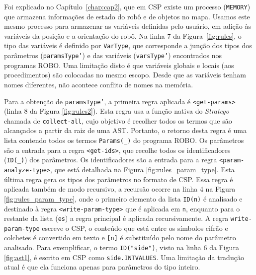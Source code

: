 Foi explicado no Capítulo~\ref{chap:cap2}, que em CSP existe um processo (\texttt{MEMORY}) que armazena informações de estado do robô e de objetos no mapa. Usamos este mesmo processo para armazenar as variáveis definidas pelo usuário, em adição às variáveis da posição e a orientação do robô. Na linha 7 da Figura~\ref{fig:rules}, o tipo das variáveis é definido por \texttt{VarType}, que corresponde a junção dos tipos dos parâmetros (\texttt{paramsType'}) e das variáveis (\texttt{varsType'}) encontrados nos programas ROBO. Uma limitação disto é que variáveis globais e locais (aos procedimentos) são colocadas no mesmo escopo. Desde que as variáveis tenham nomes diferentes, não acontece conflito de nomes na memória.   

Para a obtenção de \texttt{paramsType'}, a primeira regra aplicada é \texttt{<get-params>} (linha 8 da Figura \ref{fig:rules2}). Esta regra usa a função nativa do \textit{Stratego} chamada de \texttt{collect-all}, cujo objetivo é recolher todos os termos que são alcançados a partir da raiz de uma AST. Portanto, o retorno desta regra é uma lista contendo todos os termos \texttt{Params(\_)} do programa ROBO. Os parâmetros são a entrada para a regra \texttt{<get-ids>}, que recolhe todos os identificadores (\texttt{ID(\_)}) dos parâmetros. Os identificadores são a entrada para a regra \texttt{<param-analyze-type>}, que está detalhada na Figura \ref{fig:rules_param_type}. Esta última regra gera os tipos dos parâmetros no formato de CSP. Essa regra é aplicada também de modo recursivo, a recursão ocorre na linha 4 na Figura \ref{fig:rules_param_type}, onde o primeiro elemento da lista \texttt{ID(n)} é analisado e destinado à regra \texttt{<write-param-type>} que é aplicada em \texttt{n}, enquanto para o restante da lista (\texttt{es}) a regra principal é aplicada recursivamente. A regra \texttt{write-param-type} escreve o CSP, o conteúdo que está entre os símbolos cifrão e colchetes é convertido em texto e \texttt{[n]} é substituído pelo nome do parâmetro analisado. Para exemplificar, o termo \texttt{ID("side")}, visto na linha 6 da Figura \ref{fig:ast1}, é escrito em CSP como \texttt{side.INTVALUES}. Uma limitação da tradução atual é que ela funciona apenas para parâmetros do tipo inteiro.

